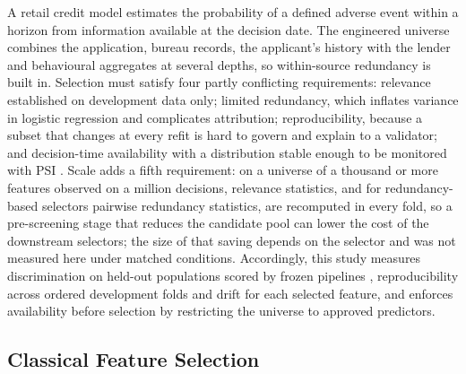 \documentclass[final,5p,twocolumn]{elsarticle}
\begin{document}
A retail credit model estimates the probability of a defined adverse event within a horizon from information available at the decision date. The engineered universe combines the application, bureau records, the applicant's history with the lender and behavioural aggregates at several depths, so within-source redundancy is built in. Selection must satisfy four partly conflicting requirements: relevance established on development data only; limited redundancy, which inflates variance in logistic regression and complicates attribution; reproducibility, because a subset that changes at every refit is hard to govern and explain to a validator; and decision-time availability with a distribution stable enough to be monitored with PSI \cite{siddiqi2006,thomas2002,yurdakul2020}. Scale adds a fifth requirement: on a universe of a thousand or more features observed on a million decisions, relevance statistics, and for redundancy-based selectors pairwise redundancy statistics, are recomputed in every fold, so a pre-screening stage that reduces the candidate pool can lower the cost of the downstream selectors; the size of that saving depends on the selector and was not measured here under matched conditions. Accordingly, this study measures discrimination on held-out populations scored by frozen pipelines \cite{bergmeir2012}, reproducibility across ordered development folds and drift for each selected feature, and enforces availability before selection by restricting the universe to approved predictors.

\subsection{Classical Feature Selection}
\label{subsec:classical_fs_background}
\end{document}
